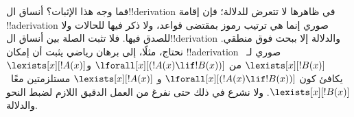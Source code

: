 \documentclass[../../../include/open-logic-section]{subfiles}
\begin{document}
فما وجه هذا الإثبات؟ أنساق ال!!{derivation} في ظاهرها لا تتعرض
للدلالة؛ فإن إقامة !!a{derivation} صوري إنما هي ترتيب رموز بمقتضى
قواعد، ولا ذكر فيها للحالات ولا للصدق فيها. فلا تثبت الصلة بين
أنساق ال!!{derivation} والدلالة إلا ببحث فوق منطقي. نحتاج، مثلًا،
إلى برهان رياضي يثبت أن إمكان !!a{derivation} صوري
لـ~$\lexists[x][!B(x)]$ من
$\lforall[x][(!A(x) \lif !B(x))]$ و$\lexists[x][!A(x)]$
يكافئ كون $\lforall[x][(!A(x) \lif !B(x))]$ و
$\lexists[x][!A(x)]$ مستلزمتين معًا~$\lexists[x][!B(x)]$.
ولا نشرع في ذلك حتى نفرغ من العمل الدقيق اللازم لضبط النحو والدلالة.
\end{document}
